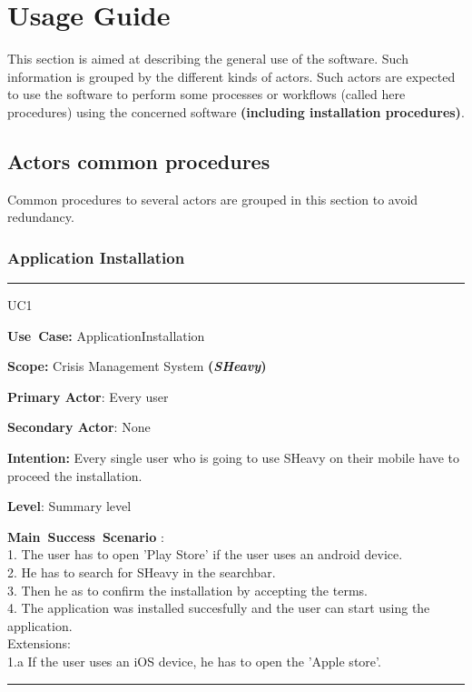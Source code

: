 \chapter{Usage Guide}
\label{chap:usage_guide}

This section is aimed at describing the general use of the software. Such
information is grouped by the different kinds of actors.
Such actors are expected to use the software to perform some
processes or workflows (called here procedures) using the concerned software
\textbf{(including installation procedures)}.

\section{Actors common procedures}
Common procedures to several actors are grouped in this section to avoid
redundancy.

\subsection{Application Installation}
\vspace{0.5cm} 
\hrule
\vspace{0.5cm}
\begin{lyxlist}{UC1}
\small{
\item [\textbf{Use~Case:}] ApplicationInstallation
\item [\textbf{Scope:}] Crisis Management System \textbf{(\emph{SHeavy})}
\item [\textbf{Primary Actor}:] Every user
\item [\textbf{Secondary Actor}:] None
\item [\textbf{Intention:}] Every single user who is going to use SHeavy on
their mobile have to proceed the installation.
\item [\textbf{Level}:]Summary level
\item [\textbf{Main~Success~Scenario}]:\\
1. The user has to open 'Play Store' if the user uses an android device.\\
2. He has to search for SHeavy in the searchbar.\\
3. Then he as to confirm the installation by accepting the terms.\\
4. The application was installed succesfully and the user can start using the
application.\\
Extensions:\\
	1.a If the user uses an iOS device, he has to open the 'Apple store'.\\
}
\end{lyxlist}
\hrule 
\vspace{0.5cm}

